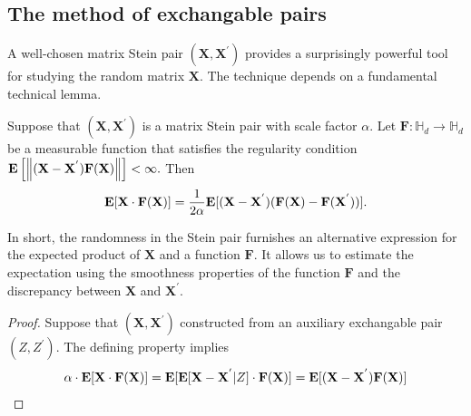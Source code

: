 \subsection{The method of exchangable pairs}
A well-chosen matrix Stein pair 
$
(
\mathbf{X}
,
\mathbf{X}^{'}
)
$
provides a surprisingly powerful tool for studying 
the random matrix $\mathbf{X}.$
The technique depends on a fundamental technical lemma.
\begin{lemma}
  Suppose that
  $
  (
    \mathbf{X}
    ,
    \mathbf{X}^{'}
  )
  $
  is a matrix Stein pair with scale factor $\alpha.$
  Let 
  $
    \mathbf{F}
    :
    \mathbb{H}_d
    \to
    \mathbb{H}_d
  $
  be a measurable function that satisfies the regularity condition
  $
  \mathbf{E}
  \left[
  \left\lVert
    (
    \mathbf{X}
    -
    \mathbf{X}^{'}
  )
  \mathbf{F}(\mathbf{X})
  \right\rVert
  \right]
  <
  \infty
  .
  $
  Then
\begin{gather}
  \mathbf{E}
  [
    \mathbf{X}
    \cdot
    \mathbf{F}
    (\mathbf{X})
  ]
  =
  \frac{1}{2\alpha}
  \mathbf{E}
  [
    (
    \mathbf{X}
    -
    \mathbf{X}^{'}
    )
    (
    \mathbf{F}
    (
    \mathbf{X}
    )
    -
    \mathbf{F}
    (
    \mathbf{X}^{'}
    )
  )
  ]
  .
\end{gather}
\end{lemma}
In short, the randomness in the Stein pair furnishes an alternative expression for the expected product of $\mathbf{X}$
and a function $\mathbf{F}.$
It allows us to estimate the expectation using the smoothness properties of the function $\mathbf{F}$ and the discrepancy between $\mathbf{X}$
and $\mathbf{X}^{'}.$
\begin{proof}
  \emph{\cite[Lemma~2.4]{Mackey2014}}
  Suppose that
  $
  (
    \mathbf{X}
    ,
    \mathbf{X}^{'}
  )
  $
  constructed from an auxiliary exchangable pair 
  $
  (
  Z,
  Z^{'}
  )
  .
  $
  The defining property implies
 \begin{gather}
   \alpha \cdot 
   \mathbf{E}[
   \mathbf{X}
   \cdot
   \mathbf{F}
   (\mathbf{X})
   ]
   =
   \mathbf{E}[
    \mathbf{E}[
    \mathbf{X}
    -
    \mathbf{X}^{'}
    \vert
    Z
    ]
    \cdot
   \mathbf{F}
   (\mathbf{X})
   ]
   =
    \mathbf{E}[
    (
    \mathbf{X}
    -
    \mathbf{X}^{'}
    )
   \mathbf{F}
   (\mathbf{X})
   ]
 \end{gather} 
\end{proof}

